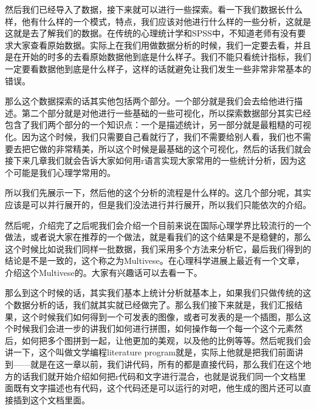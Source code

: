 \documentclass[
  oneside]{book}
\begin{document}
然后我们已经导入了数据，接下来就可以进行一些探索。看一下我们数据长什么样，他有什么样的一个模式，特点，我们应该对他进行什么样的一些分析，这就是这就是去了解我们的数据。在传统的心理统计学和SPSS中，不知道老师有没有要求大家查看原始数据。实际上在我们用做数据分析的时候，我们一定要去看，并且是在开始的时多的去看原始数据他到底是什么样子。我们不能只看统计指标，我们一定要看数据他到底是什么样子，这样的话就避免让我们发生一些非常非常基本的错误。

那么这个数据探索的话其实他包括两个部分。一个部分就是我们会去给他进行描述。第二个部分就是对他进行一些基础的一些可视化，所以探索数据部分其实已经包含了我们两个部分的一个知识点：一个是描述统计，另一部分就是最粗糙的可视化。因为这个时候，我们只需要自己看就行了，我们不需要给别人看，我们也不需要去把它做的非常精美，所以这个时候是最基础的这个可视化，然后的话我们就会接下来几章我们就会告诉大家如何用r语言实现大家常用的一些统计分析，因为这个可能是我们心理学常用的。

所以我们先展示一下，然后他的这个分析的流程是什么样的。这几个部分呢，其实应该是可以并行展开的，但是我们没法进行并行展开，所以我们只能依次的介绍。

然后呢，介绍完了之后呢我们会介绍一个目前来说在国际心理学界比较流行的一个做法，或者说大家在推荐的一个做法，就是看我们的这个结果是不是稳健的，那么这个时候比如说我们同样一批数据，我们采用多个方法来分析它，最后我们得到的结论是不是一致的，这个称之为Multivese。在心理科学进展上最近有一个文章，介绍这个Multivese的。大家有兴趣话可以去看一下。

那么到这个时候的话，其实我们基本上统计分析就基本上，如果我们只做传统的这个数据分析的话，我们就其实就已经做完了。那么我们接下来就是，我们汇报结果，这个时候我们如何得到一个可发表的图像，或者可发表的是一个插图，那么这个时候我们会进一步的讲我们如何进行拼图，如何操作每一个每一个这个元素然后，如何把多个图拼到一起，让他更加的美观，以及他的比例等等。然后呢我们会讲一下，这个叫做文学编程literature program就是，实际上他就是把我们前面讲到------就是在这一章以前，我们讲代码，所有的都是直接代码，那么我们在这个地方的话我们就开始介绍如何把r代码和文字进行混合，也就是说我们同一个文档里面既有文字描述也有代码，这个代码还是可以运行的对吧，他生成的图片还可以直接插到这个文档里面。
\end{document}

